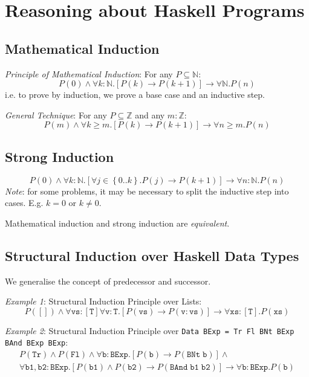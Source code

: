 \documentclass[10pt,twoside,twocolumn]{article}
\begin{document}
\section{Reasoning about Haskell Programs}


\subsection{Mathematical Induction}

\emph{Principle of Mathematical Induction}: For any $P\subseteq\mathbb{N}$:
\[
P\left(0\right)\land\forall k:\mathbb{N}.\left[P\left(k\right)\rightarrow P\left(k+1\right)\right]\rightarrow\forall\mathbb{N}.P\left(n\right)
\]
i.e. to prove by induction, we prove a base case and an inductive
step.

\emph{General Technique}: For any $P\subseteq\mathbb{Z}$ and any
$m:\mathbb{Z}$:
\[
P\left(m\right)\land\forall k\geq m.\left[P\left(k\right)\rightarrow P\left(k+1\right)\right]\rightarrow\forall n\geq m.P\left(n\right)
\]



\subsection{Strong Induction}

\[
P\left(0\right)\land\forall k:\mathbb{N}.\left[\forall j\in\left\{ 0..k\right\} .P\left(j\right)\rightarrow P\left(k+1\right)\right]\rightarrow\forall n:\mathbb{N}.P\left(n\right)
\]
\emph{Note}: for some problems, it may be necessary to split the inductive
step into cases. E.g. $k=0$ or $k\neq0$.

Mathematical induction and strong induction are \emph{equivalent}.


\subsection{Structural Induction over Haskell Data Types}

We generalise the concept of predecessor and successor.

\emph{Example 1}: Structural Induction Principle over Lists:
\[
P\left(\mathtt{[]}\right)\land\forall\mathtt{vs}:\mathtt{[T]}\forall\mathtt{v}:\mathtt{T}.\left[P\left(\mathtt{vs}\right)\rightarrow P\left(\mathtt{v:vs}\right)\right]\rightarrow\forall\mathtt{xs}:\mathtt{[T]}.P\left(\mathtt{xs}\right)
\]


\emph{Example 2}: Structural Induction Principle over \texttt{Data
BExp = Tr \textbar{} Fl \textbar{} BNt BExp \textbar{} BAnd BExp BExp}:
\begin{multline*}
P\left(\mathtt{Tr}\right)\land P\left(\mathtt{Fl}\right)\land\forall\mathtt{b}:\mathtt{BExp}.\left[P\left(\mathtt{b}\right)\rightarrow P\left(\mathtt{BNt}\;\mathtt{b}\right)\right]\land\\
\forall\mathtt{b1},\mathtt{b2}:\mathtt{BExp}.\left[P\left(\mathtt{b1}\right)\land P\left(\mathtt{b2}\right)\rightarrow P\left(\mathtt{BAnd}\;\mathtt{b1}\;\mathtt{b2}\right)\right]\rightarrow\forall\mathtt{b}:\mathtt{BExp}.P\left(\mathtt{b}\right)
\end{multline*}
\end{document}
